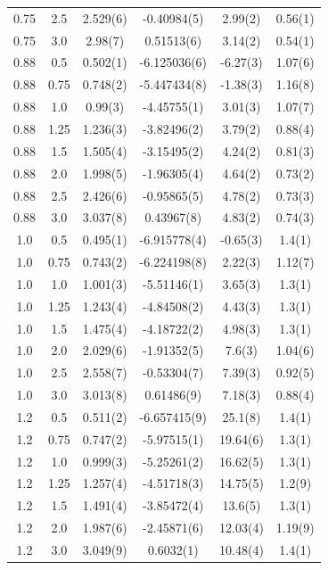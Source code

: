 \documentclass[aps,prl,reprint,groupedaddress]{revtex4-1}
\begin{document}
\begin{table}[ht]
\begin{ruledtabular}
\begin{tabular}{ c  c  c  c  c  c }
0.75 & 2.5 & 2.529(6) & -0.40984(5) & 2.99(2) & 0.56(1) \\ 
0.75 & 3.0 & 2.98(7) & 0.51513(6) & 3.14(2) & 0.54(1) \\ 
0.88 & 0.5 & 0.502(1) & -6.125036(6) & -6.27(3) & 1.07(6) \\ 
0.88 & 0.75 & 0.748(2) & -5.447434(8) & -1.38(3) & 1.16(8) \\ 
0.88 & 1.0 & 0.99(3) & -4.45755(1) & 3.01(3) & 1.07(7) \\ 
0.88 & 1.25 & 1.236(3) & -3.82496(2) & 3.79(2) & 0.88(4) \\ 
0.88 & 1.5 & 1.505(4) & -3.15495(2) & 4.24(2) & 0.81(3) \\ 
0.88 & 2.0 & 1.998(5) & -1.96305(4) & 4.64(2) & 0.73(2) \\ 
0.88 & 2.5 & 2.426(6) & -0.95865(5) & 4.78(2) & 0.73(3) \\ 
0.88 & 3.0 & 3.037(8) & 0.43967(8) & 4.83(2) & 0.74(3) \\ 
1.0 & 0.5 & 0.495(1) & -6.915778(4) & -0.65(3) & 1.4(1) \\ 
1.0 & 0.75 & 0.743(2) & -6.224198(8) & 2.22(3) & 1.12(7) \\ 
1.0 & 1.0 & 1.001(3) & -5.51146(1) & 3.65(3) & 1.3(1) \\ 
1.0 & 1.25 & 1.243(4) & -4.84508(2) & 4.43(3) & 1.3(1) \\ 
1.0 & 1.5 & 1.475(4) & -4.18722(2) & 4.98(3) & 1.3(1) \\ 
1.0 & 2.0 & 2.029(6) & -1.91352(5) & 7.6(3) & 1.04(6) \\ 
1.0 & 2.5 & 2.558(7) & -0.53304(7) & 7.39(3) & 0.92(5) \\ 
1.0 & 3.0 & 3.013(8) & 0.61486(9) & 7.18(3) & 0.88(4) \\ 
1.2 & 0.5 & 0.511(2) & -6.657415(9) & 25.1(8) & 1.4(1) \\ 
1.2 & 0.75 & 0.747(2) & -5.97515(1) & 19.64(6) & 1.3(1) \\ 
1.2 & 1.0 & 0.999(3) & -5.25261(2) & 16.62(5) & 1.3(1) \\ 
1.2 & 1.25 & 1.257(4) & -4.51718(3) & 14.75(5) & 1.2(9) \\ 
1.2 & 1.5 & 1.491(4) & -3.85472(4) & 13.6(5) & 1.3(1) \\ 
1.2 & 2.0 & 1.987(6) & -2.45871(6) & 12.03(4) & 1.19(9) \\ 
1.2 & 3.0 & 3.049(9) & 0.6032(1) & 10.48(4) & 1.4(1) 
\end{tabular}
\end{ruledtabular}
\end{table}
\endgroup
\end{document}
